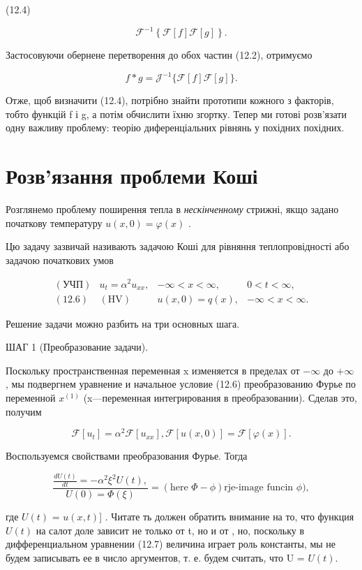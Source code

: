 \documentclass[
  ukrainian,
]{article}
\begin{document}
(12.4)

\[
\mathcal{F}^{-1}\left\{\mathcal{F}\left[f\right]\mathcal{F}\left[g\right]\right\}.
\]

Застосовуючи обернене перетворення до обох частин (12.2), отримуємо

\[
f * g = \mathcal{J}^{-1} \{ \mathcal{F} [f] \mathcal{F} [g] \}.
\]

Отже, щоб визначити (12.4), потрібно знайти прототипи кожного з
факторів, тобто функцій f і g, а потім обчислити їхню згортку. Тепер ми
готові розв'язати одну важливу проблему: теорію диференціальних рівнянь
у похідних похідних.

\section{Розв'язання проблеми
Коші}\label{ux440ux43eux437ux432ux44fux437ux430ux43dux43dux44f-ux43fux440ux43eux431ux43bux435ux43cux438-ux43aux43eux448ux456}

Розглянемо проблему поширення тепла в \emph{нескінченному} стрижні, якщо
задано початкову температуру \(u(x, 0) = \varphi(x)\) .

Цю задачу зазвичай називають задачою Коші для рівняння теплопровідності
або задачою початкових умов

\[
\begin{array}{llll} (\text{УЧП}) & u_t = \alpha^2 u_{xx}, & -\infty < x < \infty, & 0 < t < \infty, \\ (\text{12.6}) & (\text{HV}) & u(x,0) = q(x), & -\infty < x < \infty. \end{array}
\]

Решение задачи можно разбить на три основных шага.

ШАГ 1 (Преобразование задачи).

Поскольку пространственная переменная x изменяется в пределах от
\(-\infty\) до \(+\infty\) , мы подвергнем уравнение и начальное условие
(12.6) преобразованию Фурье по переменной \(x^{(1)}\) (x---переменная
интегрирования в преобразовании). Сделав это, получим

\[
\mathcal{F}[u_t] = \alpha^2 \mathcal{F}[u_{xx}],
\mathcal{F}[u(x, 0)] = \mathcal{F}[\varphi(x)].
\]

Воспользуемся свойствами преобразования Фурье. Тогда

\[
\frac{\frac{dU(t)}{dt} = -\alpha^2 \xi^2 U(t), }{U(0) = \Phi(\xi)} = (\text{here } \Phi - \phi) \text{rje-image funcin } \phi),
\]

где \(U(t)\) = \mathcal{F}{[}\(u(x, t)\){]} . Читате ть должен обратить
внимание на то, что функция \(U(t)\) на салот доле зависит не только от
t, но и от \xi , но, поскольку в дифференциальном уравнении (12.7)
величина \xi  играет роль константы, мы не будем записывать ее в число
аргументов, т. е. будем считать, что U = \(U(t)\).
\end{document}
